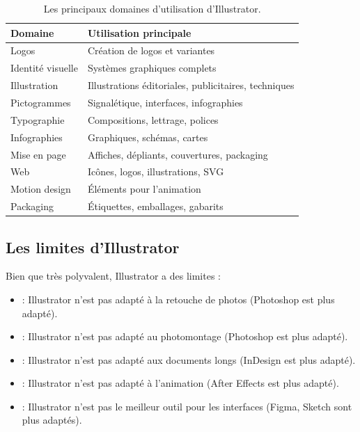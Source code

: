 \begin{table}[h!]
\centering
\begin{tabular}{@{}p{4cm}p{10cm}@{}}
\toprule
\textbf{Domaine} & \textbf{Utilisation principale} \\
\midrule
Logos & Création de logos et variantes \\
Identité visuelle & Systèmes graphiques complets \\
Illustration & Illustrations éditoriales, publicitaires, techniques \\
Pictogrammes & Signalétique, interfaces, infographies \\
Typographie & Compositions, lettrage, polices \\
Infographies & Graphiques, schémas, cartes \\
Mise en page & Affiches, dépliants, couvertures, packaging \\
Web & Icônes, logos, illustrations, SVG \\
Motion design & Éléments pour l'animation \\
Packaging & Étiquettes, emballages, gabarits \\
\bottomrule
\end{tabular}
\caption{Les principaux domaines d'utilisation d'Illustrator.}
\end{table}

\subsection{Les limites d'Illustrator}

Bien que très polyvalent, Illustrator a des limites :

\begin{itemize}
    \item {} : Illustrator n'est pas adapté à la retouche de photos (Photoshop est plus adapté).
    \item {} : Illustrator n'est pas adapté au photomontage (Photoshop est plus adapté).
    \item {} : Illustrator n'est pas adapté aux documents longs (InDesign est plus adapté).
    \item {} : Illustrator n'est pas adapté à l'animation (After Effects est plus adapté).
    \item {} : Illustrator n'est pas le meilleur outil pour les interfaces (Figma, Sketch sont plus adaptés).
\end{itemize}

